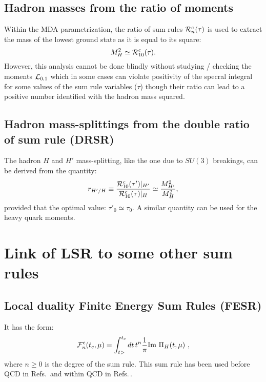 \documentclass[aps,prd,groupedaddress,nofootinbib]{revtex4-1}
\def\beq{\begin{equation}}
\def\eeq{\end{equation}}
\def\b{$\bullet~$}
\begin{document}
\subsection{Hadron masses from the ratio of moments} 
 Within the MDA parametrization, the ratio of sum rules ${\cal R}_n^c(\tau)$  is used to extract the mass of the lowest ground state as it is equal to its square:
 \beq
 M_H^2\simeq {\cal R}^c_{10} (\tau). 
 \eeq
  However, this analysis cannot be done blindly without studying / checking the  moments ${\cal L}_{0,1}$ which in some cases can violate positivity of the specral integral for some values of the sum rule variables ($\tau$)  though their ratio can lead to a positive number identified with the hadron mass squared.  
\subsection{Hadron mass-splittings from the double ratio of sum rule (DRSR) \,\cite{DRSR}\,}
The hadron $H$ and $H'$ mass-splitting, like the one due to $SU(3)$ breakings, can be derived from the quantity:
\beq
r_{H'/H}\equiv \frac{{\cal R}_{10}^c(\tau')\vert_{H'}}{{\cal R}_{10}^c(\tau)\vert_{H}}\simeq \frac{M_{H'}^2}{M_{H}^2},
\eeq
provided that the optimal value: $\tau'_0\simeq \tau_0$. A similar quantity can be used for the heavy quark moments.

 \vspace*{-0.3cm}
\section{Link of LSR to some other sum rules}
\vspace*{-0.15cm}
\subsection{Local duality Finite Energy Sum Rules (FESR)}
It has the form:
\beq
 {\cal F}^c_n(t_c,\mu)=\int_{t>}^{t_c}\hspace*{-0.cm}dt\,t^n\frac{1}{\pi} \mbox{Im}~\Pi_H(t,\mu)~,
\eeq
where $n\geq 0$ is the degree of the sum rule. This sum rule has been used before QCD in Refs.\,\cite{LOGUNOV,SAKURAI} and within QCD in Refs.\,\cite{KRASNIKOV, KATAEV,LARIN}.
\end{document}

